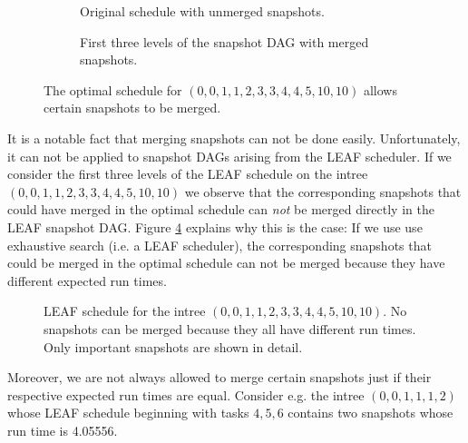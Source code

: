 \begin{figure}[th]
  \centering
  \begin{subfigure}{.58\textwidth}
    \centering
    
    \caption{Original schedule with unmerged snapshots.}
    \label{00112334451010-original-optimal-schedule}
  \end{subfigure}
  \quad
  \begin{subfigure}{.3\textwidth}
    \centering
    
    \caption{First three levels of the snapshot DAG with merged snapshots.}
    \label{00112334451010-merged-optimal-schedule}
  \end{subfigure}
  \caption{The optimal schedule for $(0,0,1,1,2,3,3,4,4,5,10,10)$ allows certain snapshots to be merged.}
  \label{fig:p3-merge-snapshots-00112334451010}
\end{figure}

It is a notable fact that merging snapshots can not be done easily. Unfortunately, it can not be applied to snapshot DAGs arising from the LEAF scheduler. If we consider the first three levels of the LEAF schedule on the intree $(0,0,1,1,2,3,3,4,4,5,10,10)$ we observe that the corresponding snapshots that could have merged in the optimal schedule can \emph{not} be merged directly in the LEAF snapshot DAG. Figure \ref{fig:p3-00112334451010-leaf-schedule-no-merging} explains why this is the case: If we use use exhaustive search (i.e. a LEAF scheduler), the corresponding snapshots that could be merged in the optimal schedule can not be merged because they have different expected run times.

\begin{figure}[ht]
  \centering{}
  
  \caption{LEAF schedule for the intree $(0,0,1,1,2,3,3,4,4,5,10,10)$. No snapshots can be merged because they all have different run times. Only important snapshots are shown in detail.}
  \label{fig:p3-00112334451010-leaf-schedule-no-merging}
\end{figure}

Moreover, we are not always allowed to merge certain snapshots just if their respective expected run times are equal. Consider e.g. the intree $(0,0,1,1,1,2)$ whose LEAF schedule beginning with tasks $4, 5, 6$ contains two snapshots whose run time is 4.05556.

